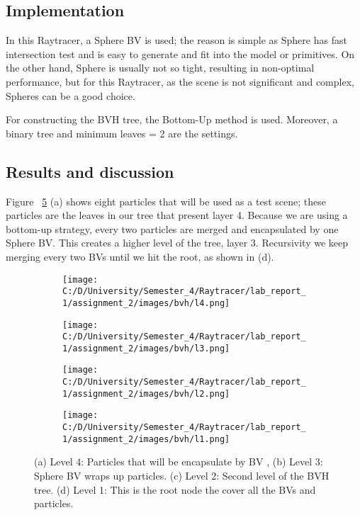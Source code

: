 \documentclass{article}
\begin{document}
	\subsection{Implementation}
	
	In this Raytracer, a Sphere BV is used; the reason is simple as Sphere has fast intersection test and is easy to generate and fit into the model or primitives. 
	On the other hand, Sphere is usually not so tight, resulting in non-optimal performance, but for this Raytracer, as the scene is not significant and complex, Spheres can be a good choice.
	
	For constructing the BVH tree, the Bottom-Up method is used. Moreover, a binary tree and minimum leaves = 2 are the settings.
	
	\subsection{Results and discussion}
	
	Figure ~\ref{fig:12} (a) shows eight particles that will be used as a test scene; these particles are the leaves in our tree that present layer 4. Because we are using a bottom-up strategy, every two particles are merged and encapsulated by one Sphere BV. This creates a higher level of the tree, layer 3. Recursivity we keep merging every two BVs until we hit the root, as shown in (d).
	
	\begin{figure}[ht]
		\begin{center}
			\begin{subfigure}{.3\textwidth}
				\centering
				\texttt{[image: C:/D/University/Semester\_4/Raytracer/lab\_report\_1/assignment\_2/images/bvh/l4.png]}  
				\caption{}
				\label{fig:sub-first}
			\end{subfigure}
			\begin{subfigure}{.3\textwidth}
				\centering
				\texttt{[image: C:/D/University/Semester\_4/Raytracer/lab\_report\_1/assignment\_2/images/bvh/l3.png]}  
				\caption{}
				\label{fig:sub-second}
			\end{subfigure}
			\begin{subfigure}{.3\textwidth}
				\centering
				\texttt{[image: C:/D/University/Semester\_4/Raytracer/lab\_report\_1/assignment\_2/images/bvh/l2.png]}  
				\caption{}
				\label{fig:sub-third}
			\end{subfigure}
			\begin{subfigure}{.3\textwidth}
				\centering
				\texttt{[image: C:/D/University/Semester\_4/Raytracer/lab\_report\_1/assignment\_2/images/bvh/l1.png]}  
				\caption{}
				\label{fig:sub-forth}
			\end{subfigure}
			\caption{(a) Level 4: Particles that will be encapsulate by BV , (b) Level 3: Sphere BV wraps up particles. (c) Level 2: Second level of the BVH tree. (d) Level 1: This is the root node the cover all the BVs and particles.}
			\label{fig:12}
		\end{center}
	\end{figure}
	
\end{document}
